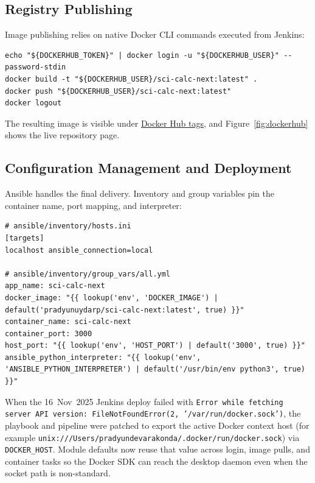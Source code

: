\documentclass[12pt]{article}
\begin{document}
\subsection{Registry Publishing}
Image publishing relies on native Docker CLI commands executed from Jenkins:
\begin{verbatim}
echo "${DOCKERHUB_TOKEN}" | docker login -u "${DOCKERHUB_USER}" --password-stdin
docker build -t "${DOCKERHUB_USER}/sci-calc-next:latest" .
docker push "${DOCKERHUB_USER}/sci-calc-next:latest"
docker logout
\end{verbatim}
The resulting image is visible under \href{https://hub.docker.com/r/pradyunuydarp/sci-calc-next/tags}{Docker Hub tags}, and Figure~\ref{fig:dockerhub} shows the live repository page.

\subsection{Configuration Management and Deployment}
Ansible handles the final delivery. Inventory and group variables pin the container name, port mapping, and interpreter:
\begin{verbatim}
# ansible/inventory/hosts.ini
[targets]
localhost ansible_connection=local

# ansible/inventory/group_vars/all.yml
app_name: sci-calc-next
docker_image: "{{ lookup('env', 'DOCKER_IMAGE') | default('pradyunuydarp/sci-calc-next:latest', true) }}"
container_name: sci-calc-next
container_port: 3000
host_port: "{{ lookup('env', 'HOST_PORT') | default('3000', true) }}"
ansible_python_interpreter: "{{ lookup('env', 'ANSIBLE_PYTHON_INTERPRETER') | default('/usr/bin/env python3', true) }}"
\end{verbatim}

When the 16~Nov~2025 Jenkins deploy failed with \texttt{Error while fetching server API version: FileNotFoundError(2, '/var/run/docker.sock')}, the playbook and pipeline were patched to export the active Docker context host (for example \texttt{unix:///Users/pradyundevarakonda/.docker/run/docker.sock}) via \texttt{DOCKER\_HOST}. Module defaults now reuse that value across login, image pulls, and container tasks so the Docker SDK can reach the desktop daemon even when the socket path is non-standard.
\end{document}
